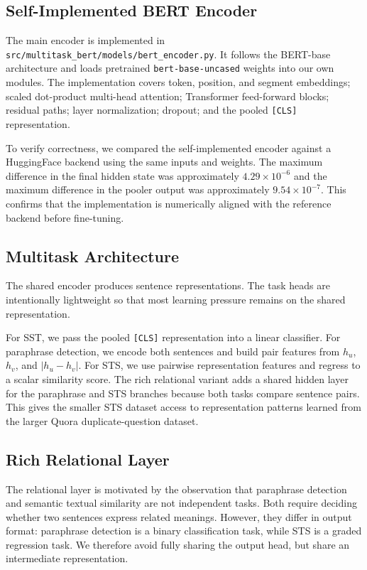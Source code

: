\documentclass{article}
\begin{document}
\subsection{Self-Implemented BERT Encoder}

The main encoder is implemented in \texttt{src/multitask\_bert/models/bert\_encoder.py}. It follows the BERT-base architecture and loads pretrained \texttt{bert-base-uncased} weights into our own modules. The implementation covers token, position, and segment embeddings; scaled dot-product multi-head attention; Transformer feed-forward blocks; residual paths; layer normalization; dropout; and the pooled \texttt{[CLS]} representation.

To verify correctness, we compared the self-implemented encoder against a HuggingFace backend using the same inputs and weights. The maximum difference in the final hidden state was approximately $4.29 \times 10^{-6}$ and the maximum difference in the pooler output was approximately $9.54 \times 10^{-7}$. This confirms that the implementation is numerically aligned with the reference backend before fine-tuning.

\subsection{Multitask Architecture}

The shared encoder produces sentence representations. The task heads are intentionally lightweight so that most learning pressure remains on the shared representation.

For SST, we pass the pooled \texttt{[CLS]} representation into a linear classifier. For paraphrase detection, we encode both sentences and build pair features from $h_u$, $h_v$, and $|h_u-h_v|$. For STS, we use pairwise representation features and regress to a scalar similarity score. The rich relational variant adds a shared hidden layer for the paraphrase and STS branches because both tasks compare sentence pairs. This gives the smaller STS dataset access to representation patterns learned from the larger Quora duplicate-question dataset.

\subsection{Rich Relational Layer}

The relational layer is motivated by the observation that paraphrase detection and semantic textual similarity are not independent tasks. Both require deciding whether two sentences express related meanings. However, they differ in output format: paraphrase detection is a binary classification task, while STS is a graded regression task. We therefore avoid fully sharing the output head, but share an intermediate representation.
\end{document}
